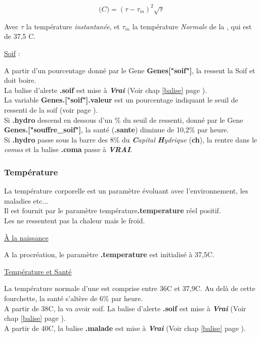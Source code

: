 \documentclass[french]{report}
\begin{document}
\[ \mathcal(C) = (\tau - \tau_m)^2\sqrt{\tau} \]

Avec $\tau$ la température \textit{instantanée}, et $\tau_m$ la température \textit{Normale} de la \CoCiX, qui est de 37,5 \degres C.\\

\begin{center}
	\underline{Soif} :\label{soif}
\end{center}
A partir d'un pourcentage donné par le Gene \textbf{Genes["soif"]}, la \CoCiX ressent la Soif et doit boire.\\
La balise d'alerte \textbf{.soif} est mise à \textbf{\textit{Vrai}} (Voir chap \ref{balise} page \pageref{balise}).\\
La variable \textbf{Genes.["soif"].valeur} est un pourcentage indiquant le seuil de ressenti de la soif (voir page \pageref{liste_gene}).\\


Si \textbf{.hydro} descend en dessous d'un \% du seuil de ressenti, donné par le Gene \textbf{Genes.["souffre\_soif"]}, la santé (\textbf{.sante}) diminue de 10,2\% par heure.\\

Si \textbf{.hydro} passe sous la barre des 8\% du \textit{\textbf{C}apital \textbf{H}ydrique} (\textbf{ch}), la \CoCiX rentre dans le \textit{comas} et la balise \textbf{.coma} passe à \textit{\textbf{VRAI}}.


\subsubsection{Température}\label{temperature}
La température corporelle est un paramètre évoluant avec l'environnement, les maladies etc...\\
Il est fournit par le paramètre température\textbf{.temperature} réel positif.\\
Les \CoCiX ne ressentent pas la chaleur mais le froid.

\begin{center}
	\underline{À la naissance}
\end{center}
A la procréation, le paramètre \textbf{.temperature} est initialisé à 37,5\degres C.\\

\begin{center}
	\underline{Température et Santé}
\end{center}
La température normale d'une \CoCiX est comprise entre 36\degres C et 37,9\degres C. Au delà de cette fourchette, la santé s'altère de 6\% par heure.\\
A partir de 38\degres C, la \CoCiX va avoir soif. La balise d'alerte \textbf{.soif} est mise à \textbf{\textit{Vrai}} (Voir chap \ref{balise} page \pageref{balise}).\\
A partir de 40\degres C, la balise \textbf{.malade} est mise à \textbf{\textit{Vrai}} (Voir chap \ref{balise} page \pageref{balise}).\\
\end{document}
